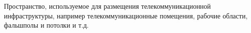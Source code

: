 Пространство, используемое для размещения телекоммуникационной
инфраструктуры, например телекоммуникационные помещения, рабочие области,
фальшполы и потолки и т.д.